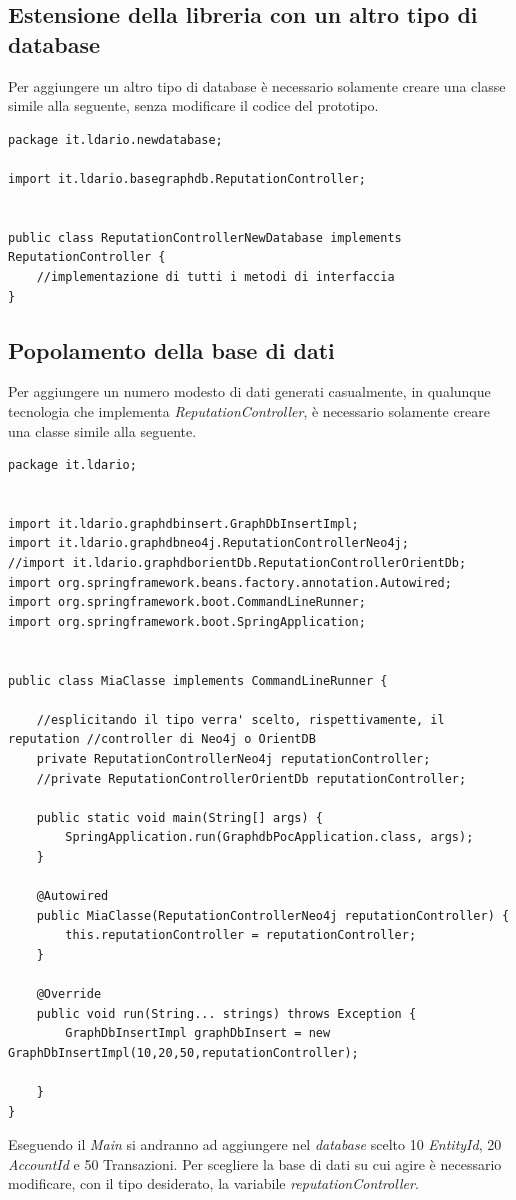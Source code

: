 \subsection{Estensione della libreria con un altro tipo di database}
Per aggiungere un altro tipo di database è necessario solamente creare una classe simile alla seguente, senza modificare il codice del prototipo.
\begin{lstlisting}
package it.ldario.newdatabase;

import it.ldario.basegraphdb.ReputationController;


public class ReputationControllerNewDatabase implements ReputationController {
    //implementazione di tutti i metodi di interfaccia
}
\end{lstlisting}

\subsection{Popolamento della base di dati}
Per aggiungere un numero modesto di dati generati casualmente, in qualunque tecnologia che implementa \textit{ReputationController}, è necessario solamente creare una classe simile alla seguente.
\begin{lstlisting}
package it.ldario;


import it.ldario.graphdbinsert.GraphDbInsertImpl;
import it.ldario.graphdbneo4j.ReputationControllerNeo4j;
//import it.ldario.graphdborientDb.ReputationControllerOrientDb;
import org.springframework.beans.factory.annotation.Autowired;
import org.springframework.boot.CommandLineRunner;
import org.springframework.boot.SpringApplication;


public class MiaClasse implements CommandLineRunner {

    //esplicitando il tipo verra' scelto, rispettivamente, il reputation //controller di Neo4j o OrientDB
    private ReputationControllerNeo4j reputationController;
    //private ReputationControllerOrientDb reputationController;

    public static void main(String[] args) {
        SpringApplication.run(GraphdbPocApplication.class, args);
    }

    @Autowired
    public MiaClasse(ReputationControllerNeo4j reputationController) {
        this.reputationController = reputationController;
    }

    @Override
    public void run(String... strings) throws Exception {
        GraphDbInsertImpl graphDbInsert = new GraphDbInsertImpl(10,20,50,reputationController);

    }
}
\end{lstlisting}
Eseguendo il \textit{Main} si andranno ad aggiungere nel \textit{database} scelto 10 \textit{EntityId}, 20 \textit{AccountId} e 50 Transazioni. Per scegliere la base di dati su cui agire è necessario modificare, con il tipo desiderato, la variabile \textit{reputationController}.




